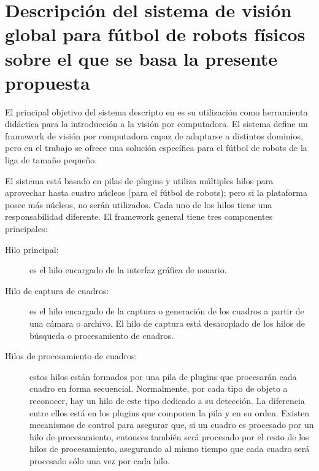 
\section{Descripción del sistema de visión global para fútbol de robots físicos
sobre el que se basa la presente propuesta}


El principal objetivo del sistema descripto en \cite{torres2014} es su
utilización como herramienta didáctica para la introducción a la visión por
computadora. El sistema define un framework de visión por computadora capaz de
adaptarse a distintos dominios, pero en el trabajo se ofrece una solución
específica para el fútbol de robots de la liga de tamaño pequeño.

El sistema está basado en pilas de plugins y utiliza múltiples hilos para
aprovechar hasta cuatro núcleos (para el fútbol de robots); pero si la
plataforma posee más núcleos, no serán utilizados. Cada uno de los hilos tiene
una responsabilidad diferente. El framework general tiene tres componentes
principales:

\begin{description}

	\item[Hilo principal:] es el hilo encargado de la interfaz gráfica de
		usuario.

	\item[Hilo de captura de cuadros:] es el hilo encargado de la captura o
		generación de los cuadros a partir de una cámara o archivo. El
		hilo de captura está desacoplado de los hilos de búsqueda o
		procesamiento de cuadros.

	\item[Hilos de procesamiento de cuadros:] estos hilos están formados por
		una pila de plugins que procesarán cada cuadro en forma
		secuencial. Normalmente, por cada tipo de objeto a reconocer,
		hay un hilo de este tipo dedicado a su detección. La diferencia
		entre ellos está en los plugins que componen la pila y en su
		orden. Existen mecanismos de control para asegurar que, si un
		cuadro es procesado por un hilo de procesamiento, entonces
		también será procesado por el resto de los hilos de
		procesamiento, asegurando al mismo tiempo que cada cuadro será
		procesado sólo una vez por cada hilo.

\end{description}

